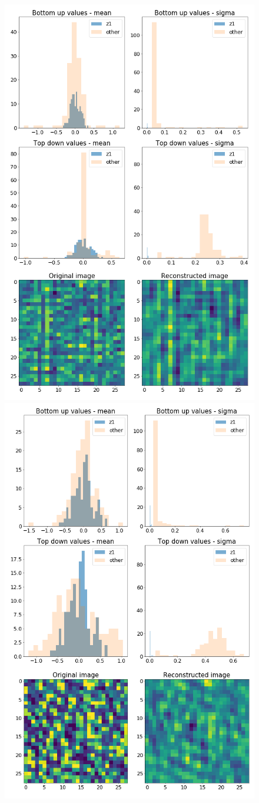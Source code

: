 \documentclass[12pt, english]{article}
\begin{document}
\begin{figure}[H]
  \begin{minipage}{0.5\linewidth}
    \centering
    \includegraphics[width=.6\linewidth]{z1_vis/z1_vis_contrast_no_norm/15_DenseLinLinLadderVAE_textures_noContrastNorm_contrast-stats-1_TD_BU_COMPS_1.png}
  \end{minipage}
  \begin{minipage}{0.5\linewidth}
    \centering
    \includegraphics[width=.6\linewidth]{z1_vis/z1_vis_contrast_no_norm/15_DenseLinLinLadderVAE_textures_noContrastNorm_contrast-stats-2_TD_BU_COMPS_1.png} 
  \end{minipage}


\end{figure}
\end{document}
